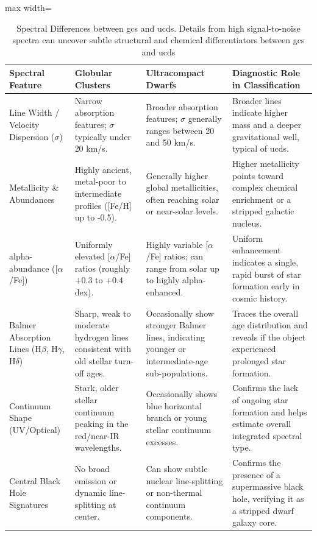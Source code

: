 \begin{table}[htbp]
\centering
\caption[Spectral Differences between GCs and UCDs.]{Spectral Differences between \glspl{gc} and \glspl{ucd}. Details from high signal-to-noise spectra can uncover subtle structural and chemical differentiators between \glspl{gc} and \glspl{ucd}}
\label{tab:gc_vs_ucd_spectra}
\begin{adjustbox}{max width=\textwidth}
\begin{tabular}{p{2.5cm} p{3.8cm} p{4cm} p{4.2cm}}
\doubletoprule
\textbf{Spectral Feature} & \textbf{Globular Clusters} & \textbf{Ultracompact Dwarfs} & \textbf{Diagnostic Role in Classification} \\ 
\midrule
Line Width / Velocity Dispersion ($\sigma$) & Narrow absorption features; $\sigma$ typically under 20 km/s. & Broader absorption features; $\sigma$ generally ranges between 20 and 50 km/s. & Broader lines indicate higher mass and a deeper gravitational well, typical of \glspl{ucd}. \\ \hline
Metallicity \& Abundances & Highly ancient, metal-poor to intermediate profiles ([Fe/H] up to -0.5). & Generally higher global metallicities, often reaching solar or near-solar levels. & Higher metallicity points toward complex chemical enrichment or a stripped galactic nucleus. \\ \hline
\gls{alpha-abundance} ([$\alpha$/Fe]) & Uniformly elevated [$\alpha$/Fe] ratios (roughly +0.3 to +0.4 dex). & Highly variable [$\alpha$/Fe] ratios; can range from solar up to highly alpha-enhanced. & Uniform enhancement indicates a single, rapid burst of star formation early in cosmic history. \\ \hline
Balmer Absorption Lines (H$\beta$, H$\gamma$, H$\delta$) & Sharp, weak to moderate hydrogen lines consistent with old stellar turn-off ages. & Occasionally show stronger Balmer lines, indicating younger or intermediate-age sub-populations. & Traces the overall age distribution and reveals if the object experienced prolonged star formation. \\ \hline
Continuum Shape (UV/Optical) & Stark, older stellar continuum peaking in the red/near-IR wavelengths. & Occasionally shows blue horizontal branch or young stellar continuum excesses. & Confirms the lack of ongoing star formation and helps estimate overall integrated spectral type. \\ \hline
Central Black Hole Signatures & No broad emission or dynamic line-splitting at center. & Can show subtle nuclear line-splitting or non-thermal continuum components. & Confirms the presence of a supermassive black hole, verifying it as a stripped dwarf galaxy core. \\ \hline
\end{tabular}
\end{adjustbox}
\end{table}

